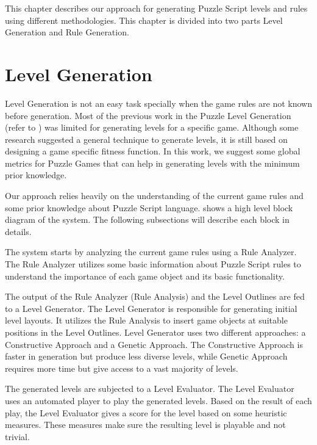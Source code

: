 This chapter describes our approach for generating Puzzle Script levels and rules using different methodologies. This chapter is divided into two parts Level Generation and Rule Generation.

\section{Level Generation}
Level Generation is not an easy task specially when the game rules are not known before generation. Most of the previous work in the Puzzle Level Generation (refer to ) was limited for generating levels for a specific game. Although some research suggested a general technique to generate levels, it is still based on designing a game specific fitness function. In this work, we suggest some global metrics for Puzzle Games that can help in generating levels with the minimum prior knowledge.\\\par

Our approach relies heavily on the understanding of the current game rules and some prior knowledge about Puzzle Script language.  shows a high level block diagram of the system. The following subsections will describe each block in details.


The system starts by analyzing the current game rules using a Rule Analyzer. The Rule Analyzer utilizes some basic information about Puzzle Script rules to understand the importance of each game object and its basic functionality.\\\par

The output of the Rule Analyzer (Rule Analysis) and the Level Outlines are fed to a Level Generator. The Level Generator is responsible for generating initial level layouts. It utilizes the Rule Analysis to insert game objects at suitable positions in the Level Outlines. Level Generator uses two different approaches: a Constructive Approach and a Genetic Approach. The Constructive Approach is faster in generation but produce less diverse levels, while Genetic Approach requires more time but give access to a vast majority of levels.\\\par

The generated levels are subjected to a Level Evaluator. The Level Evaluator uses an automated player to play the generated levels. Based on the result of each play, the Level Evaluator gives a score for the level based on some heuristic measures. These measures make sure the resulting level is playable and not trivial.\\\par

